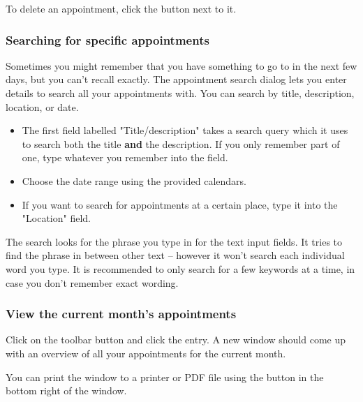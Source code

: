 
To delete an appointment, click the  button next to it.



\subsubsection{Searching for specific appointments}


Sometimes you might remember that you have something to go to in the next few
days, but you can't recall exactly. The appointment search dialog lets you enter
details to search all your appointments with. You can search by title,
description, location, or date.

\begin{itemize}
    \item The first field labelled "Title/description" takes a search query
        which it uses to search both the title \textbf{and} the description. If
        you only remember part of one, type whatever you remember into the
        field.
    \item Choose the date range using the provided calendars.
    \item If you want to search for appointments at a certain place,
        type it into the "Location" field.
\end{itemize}

The search looks for the phrase you type in for the text input fields. It tries
to find the phrase in between other text -- however it won't search each
individual word you type. It is recommended to only search for a few keywords at
a time, in case you don't remember exact wording.


\subsubsection{View the current month's appointments}


Click on the  toolbar button and click the  entry. A new window should come up with an overview of all your
appointments for the current month.

You can print the window to a printer or PDF file using the 
button in the bottom right of the window.


